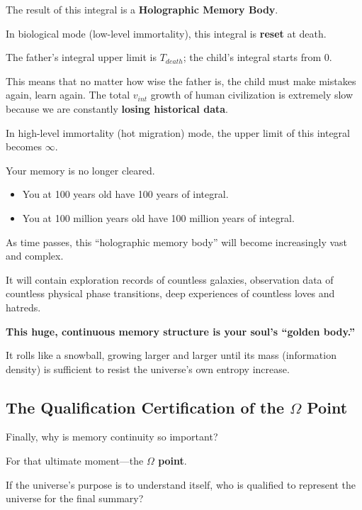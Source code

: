 The result of this integral is a \textbf{Holographic Memory Body}.

In biological mode (low-level immortality), this integral is \textbf{reset} at death.

The father's integral upper limit is $T_{death}$; the child's integral starts from 0.

This means that no matter how wise the father is, the child must make mistakes again, learn again. The total $v_{int}$ growth of human civilization is extremely slow because we are constantly \textbf{losing historical data}.

In high-level immortality (hot migration) mode, the upper limit of this integral becomes \textbf{$\infty$}.

Your memory is no longer cleared.

\begin{itemize}
\item You at 100 years old have 100 years of integral.

\item You at 100 million years old have 100 million years of integral.
\end{itemize}

As time passes, this ``holographic memory body'' will become increasingly vast and complex.

It will contain exploration records of countless galaxies, observation data of countless physical phase transitions, deep experiences of countless loves and hatreds.

\textbf{This huge, continuous memory structure is your soul's ``golden body.''}

It rolls like a snowball, growing larger and larger until its mass (information density) is sufficient to resist the universe's own entropy increase.

\subsection{The Qualification Certification of the $\Omega$ Point}

Finally, why is memory continuity so important?

For that ultimate moment---the \textbf{$\Omega$ point}.

If the universe's purpose is to understand itself, who is qualified to represent the universe for the final summary?

